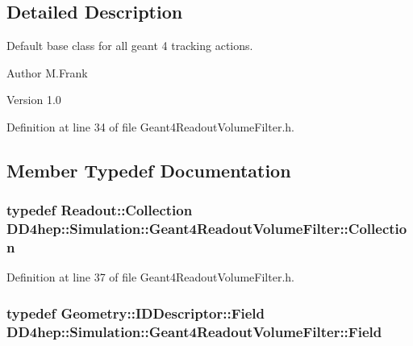\subsection{Detailed Description}
Default base class for all geant 4 tracking actions. \begin{DoxyAuthor}{Author}
M.Frank 
\end{DoxyAuthor}
\begin{DoxyVersion}{Version}
1.0 
\end{DoxyVersion}


Definition at line 34 of file Geant4ReadoutVolumeFilter.h.

\subsection{Member Typedef Documentation}
\hypertarget{class_d_d4hep_1_1_simulation_1_1_geant4_readout_volume_filter_a8a5e97e2736eb07d0d98f3300ca4b61d}{
\subsubsection[{Collection}]{\setlength{\rightskip}{0pt plus 5cm}typedef {\bf Readout::Collection} {\bf DD4hep::Simulation::Geant4ReadoutVolumeFilter::Collection}}}
\label{class_d_d4hep_1_1_simulation_1_1_geant4_readout_volume_filter_a8a5e97e2736eb07d0d98f3300ca4b61d}


Definition at line 37 of file Geant4ReadoutVolumeFilter.h.\hypertarget{class_d_d4hep_1_1_simulation_1_1_geant4_readout_volume_filter_a6b5e464fd34617d118c15b917c9094fa}{
\subsubsection[{Field}]{\setlength{\rightskip}{0pt plus 5cm}typedef {\bf Geometry::IDDescriptor::Field} {\bf DD4hep::Simulation::Geant4ReadoutVolumeFilter::Field}}}
\label{class_d_d4hep_1_1_simulation_1_1_geant4_readout_volume_filter_a6b5e464fd34617d118c15b917c9094fa}


